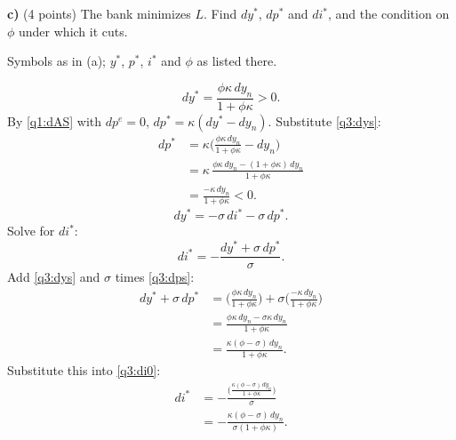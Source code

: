 \textbf{c)} (4 points) The bank minimizes $L$. Find $dy^*$, $dp^*$ and $di^*$, and the condition on $\phi$ under which it cuts.
\resolespaco
\begin{sol}
\begin{notacao}
\item Symbols as in (a); $y^*$, $p^*$, $i^*$ and $\phi$ as listed there.
\end{notacao}
\begin{equation}
dy^*=\frac{\phi\kappa\,dy_n}{1+\phi\kappa}>0 . \label{q3:dys}
\end{equation}
By \eqref{q1:dAS} with $dp^e=0$, $dp^*=\kappa(dy^*-dy_n)$. Substitute \eqref{q3:dys}:
\begin{align}
dp^*&=\kappa\Big(\frac{\phi\kappa\,dy_n}{1+\phi\kappa}-dy_n\Big)\nonumber\\
&=\kappa\,\frac{\phi\kappa\,dy_n-(1+\phi\kappa)\,dy_n}{1+\phi\kappa}\nonumber\\
&=\frac{-\kappa\,dy_n}{1+\phi\kappa}<0 . \label{q3:dps}
\end{align}
\begin{equation}
dy^*=-\sigma\,di^*-\sigma\,dp^* . \nonumber
\end{equation}
Solve for $di^*$:
\begin{equation}
di^*=-\frac{dy^*+\sigma\,dp^*}{\sigma}. \label{q3:di0}
\end{equation}
Add \eqref{q3:dys} and $\sigma$ times \eqref{q3:dps}:
\begin{align*}
dy^*+\sigma\,dp^*&=\Big(\frac{\phi\kappa\,dy_n}{1+\phi\kappa}\Big)+\sigma\Big(\frac{-\kappa\,dy_n}{1+\phi\kappa}\Big)\\
&=\frac{\phi\kappa\,dy_n-\sigma\kappa\,dy_n}{1+\phi\kappa}\\
&=\frac{\kappa(\phi-\sigma)\,dy_n}{1+\phi\kappa}.
\end{align*}
Substitute this into \eqref{q3:di0}:
\begin{align}
di^*&=-\frac{\Big(\frac{\kappa(\phi-\sigma)\,dy_n}{1+\phi\kappa}\Big)}{\sigma}\nonumber\\
&=-\frac{\kappa(\phi-\sigma)\,dy_n}{\sigma(1+\phi\kappa)}. \label{q3:dis}
\end{align}
\end{sol}

